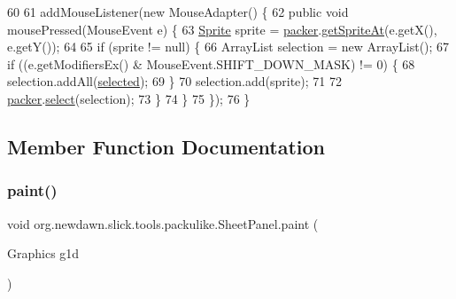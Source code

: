\begin{DoxyCode}
60         
61         addMouseListener(\textcolor{keyword}{new} MouseAdapter() \{
62             \textcolor{keyword}{public} \textcolor{keywordtype}{void} mousePressed(MouseEvent e) \{
63                 \mbox{\hyperlink{class_sprite}{Sprite}} sprite = \mbox{\hyperlink{classorg_1_1newdawn_1_1slick_1_1tools_1_1packulike_1_1_sheet_panel_abb5acf8625323539da1fea16df35d97e}{packer}}.\mbox{\hyperlink{classorg_1_1newdawn_1_1slick_1_1tools_1_1packulike_1_1_packer_a34ac2a1c7cef9dfc9dbef0cd3d636203}{getSpriteAt}}(e.getX(), e.getY());
64                 
65                 \textcolor{keywordflow}{if} (sprite != null) \{
66                     ArrayList selection = \textcolor{keyword}{new} ArrayList();
67                     \textcolor{keywordflow}{if} ((e.getModifiersEx() & MouseEvent.SHIFT\_DOWN\_MASK) != 0) \{
68                         selection.addAll(\mbox{\hyperlink{classorg_1_1newdawn_1_1slick_1_1tools_1_1packulike_1_1_sheet_panel_a307218d49f6dfea97933ccf80ab293aa}{selected}});
69                     \}
70                     selection.add(sprite);
71                     
72                     \mbox{\hyperlink{classorg_1_1newdawn_1_1slick_1_1tools_1_1packulike_1_1_sheet_panel_abb5acf8625323539da1fea16df35d97e}{packer}}.\mbox{\hyperlink{classorg_1_1newdawn_1_1slick_1_1tools_1_1packulike_1_1_packer_a7811f0b2c45bb43e48fb3edbb65115e3}{select}}(selection);
73                 \}
74             \}
75         \});
76     \}
\end{DoxyCode}


\subsection{Member Function Documentation}
\mbox{\label{classorg_1_1newdawn_1_1slick_1_1tools_1_1packulike_1_1_sheet_panel_a528de0e88d97cf5173cff625eec239a0}} 
\subsubsection{\texorpdfstring{paint()}{paint()}}
{\footnotesize\ttfamily void org.\+newdawn.\+slick.\+tools.\+packulike.\+Sheet\+Panel.\+paint (\begin{DoxyParamCaption}\item[{Graphics}]{g1d }\end{DoxyParamCaption})\hspace{0.3cm}{\ttfamily [inline]}}

